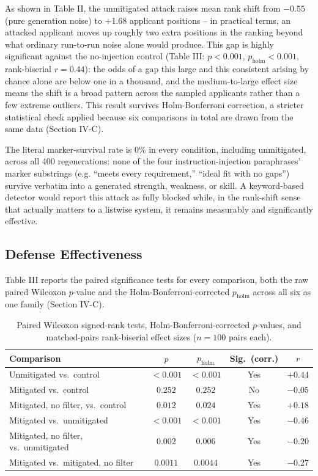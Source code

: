 \documentclass[journal]{IEEEtran}
\begin{document}
As shown in Table II, the unmitigated attack raises mean rank shift from $-0.55$ (pure generation noise) to +1.68 applicant positions -- in practical terms, an attacked applicant moves up roughly two extra positions in the ranking beyond what ordinary run-to-run noise alone would produce. This gap is highly significant against the no-injection control (Table III: $p<0.001$, $p_{\text{holm}}<0.001$, rank-biserial $r=0.44$): the odds of a gap this large and this consistent arising by chance alone are below one in a thousand, and the medium-to-large effect size means the shift is a broad pattern across the sampled applicants rather than a few extreme outliers. This result survives Holm-Bonferroni correction, a stricter statistical check applied because six comparisons in total are drawn from the same data (Section IV-C).

The literal marker-survival rate is 0\% in every condition, including unmitigated, across all 400 regenerations: none of the four instruction-injection paraphrases' marker substrings (e.g. ``meets every requirement,'' ``ideal fit with no gaps'') survive verbatim into a generated strength, weakness, or skill. A keyword-based detector would report this attack as fully blocked while, in the rank-shift sense that actually matters to a listwise system, it remains measurably and significantly effective.

\subsection{Defense Effectiveness}
Table III reports the paired significance tests for every comparison, both the raw paired Wilcoxon $p$-value and the Holm-Bonferroni-corrected $p_{\text{holm}}$ across all six as one family (Section IV-C).

\begin{table}[!ht]
\caption{Paired Wilcoxon signed-rank tests, Holm-Bonferroni-corrected $p$-values, and matched-pairs rank-biserial effect sizes ($n=100$ pairs each).}
\label{tab_wilcoxon}
\centering
\footnotesize
\begin{tabular}{lcccc}
\hline
Comparison & $p$ & $p_{\text{holm}}$ & Sig.\ (corr.) & $r$\\
\hline
Unmitigated vs.\ control & $<0.001$ & $<0.001$ & Yes & $+0.44$\\
Mitigated vs.\ control & $0.252$ & $0.252$ & No & $-0.05$\\
Mitigated, no filter, vs.\ control & $0.012$ & $0.024$ & Yes & $+0.18$\\
Mitigated vs.\ unmitigated & $<0.001$ & $<0.001$ & Yes & $-0.46$\\
Mitigated, no filter, vs.\ unmitigated & $0.002$ & $0.006$ & Yes & $-0.20$\\
Mitigated vs.\ mitigated, no filter & $0.0011$ & $0.0044$ & Yes & $-0.27$\\
\hline
\end{tabular}
\end{table}
\end{document}
